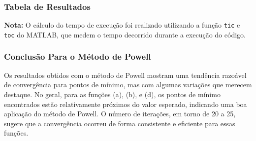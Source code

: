 \documentclass[a4paper, 12pt]{article}
\begin{document}
\subsubsection{Tabela de Resultados}

\begin{table}[H]
    \centering
    \caption{Resultados do Método de Powell para cada Função}
    \label{tab:powell_results}
\end{table}
\textbf{Nota:} O cálculo do tempo de execução foi realizado utilizando a função \texttt{tic} e \texttt{toc} do MATLAB, que medem o tempo decorrido durante a execução do código.\\

\subsubsection{Conclusão Para o Método de Powell}

Os resultados obtidos com o método de Powell mostram uma tendência razoável de convergência para pontos de mínimo, mas com algumas variações que merecem destaque. No geral, para as funções (a), (b), e (d), os pontos de mínimo encontrados estão relativamente próximos do valor esperado, indicando uma boa aplicação do método de Powell. O número de iterações, em torno de 20 a 25, sugere que a convergência ocorreu de forma consistente e eficiente para essas funções.\\
\end{document}
